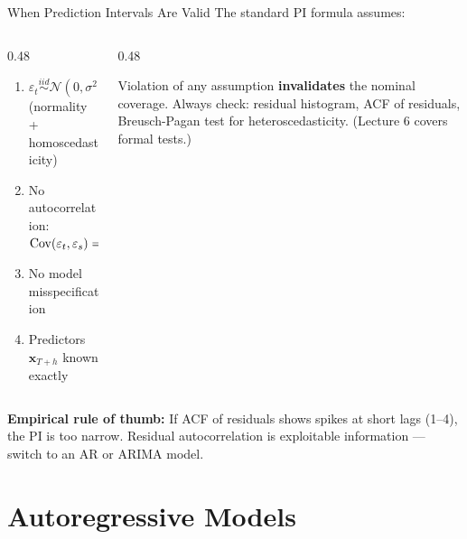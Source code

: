 \documentclass[aspectratio=169, 11pt]{beamer}
\begin{document}
\begin{frame}{When Prediction Intervals Are Valid}
  The standard PI formula assumes:

  \vspace{0.1cm}
  \begin{columns}[T]
    \begin{column}{0.48\textwidth}
      {\small\begin{enumerate}
        \item $\varepsilon_t \stackrel{iid}{\sim} \mathcal{N}(0,\sigma^2)$
              (normality + homoscedasticity)
        \item No autocorrelation: $\operatorname{Cov}(\varepsilon_t, \varepsilon_s) = 0$
        \item No model misspecification
        \item Predictors $\mathbf{x}_{T+h}$ known exactly
      \end{enumerate}}
    \end{column}
    \begin{column}{0.48\textwidth}
      \begin{warningbox}
        \small
        Violation of any assumption
        \textbf{invalidates} the nominal coverage.
        Always check: residual histogram,
        ACF of residuals, Breusch-Pagan test
        for heteroscedasticity.
        (Lecture 6 covers formal tests.)
      \end{warningbox}
    \end{column}
  \end{columns}
  \vspace{0.15cm}
  \begin{keybox}
    \small
    \textbf{Empirical rule of thumb:} If ACF of residuals shows spikes
    at short lags (1–4), the PI is too narrow. Residual autocorrelation
    is exploitable information --- switch to an AR or ARIMA model.
  \end{keybox}
\end{frame}

\section{Autoregressive Models}

\end{document}

